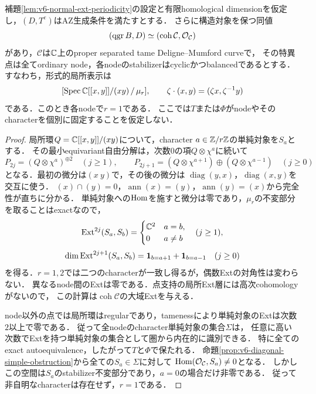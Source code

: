 \documentclass[11pt,a4paper]{ltjsarticle}
\begin{document}
\begin{corollary}[Balancedなstacky節点の排除]
\label{cor:v6-balanced-node-obstruction}
補題\ref{lem:v6-normal-ext-periodicity}の設定と有限homological dimensionを仮定し，$(D,T^e)$はAZ生成条件を満たすとする．
さらに構造対象を保つ同値
\[
 (\operatorname{qgr} B,D)\simeq(\operatorname{coh}\mathcal C,\mathcal O_{\mathcal C})
\]
があり，$\mathcal C$は$\mathbb C$上のproper separated tame Deligne--Mumford curveで，
その特異点は全てordinary node，各nodeのstabilizerはcyclicかつbalancedであるとする．
すなわち，形式的局所表示は
\[
 [\operatorname{Spec}\mathbb C[[x,y]]/(xy)\,/\,\mu_r],\qquad
 \zeta\cdot(x,y)=(\zeta x,\zeta^{-1}y)
\]
である．このとき各nodeで$r=1$である．
ここでは$T$または$\Phi$がnodeやそのcharacterを個別に固定することを仮定しない．
\end{corollary}
\begin{proof}
局所環$Q=\mathbb C[[x,y]]/(xy)$について，character $a\in\mathbb Z/r\mathbb Z$の単純対象を$S_a$とする．
その最小equivariant自由分解は，次数$0$の項$Q\otimes\chi^a$に続いて
\[
 P_{2j}=(Q\otimes\chi^a)^{\oplus2}\quad(j\geq1),\qquad
 P_{2j+1}=(Q\otimes\chi^{a+1})\oplus(Q\otimes\chi^{a-1})\quad(j\geq0)
\]
となる．最初の微分は$(x\ y)$で，その後の微分は
$\operatorname{diag}(y,x)$，$\operatorname{diag}(x,y)$を交互に使う．
$(x)\cap(y)=0$，$\operatorname{ann}(x)=(y)$，$\operatorname{ann}(y)=(x)$から完全性が直ちに分かる．
単純対象への$\operatorname{Hom}$を施すと微分は零であり，$\mu_r$の不変部分を取ることはexactなので，
\[
 \operatorname{Ext}^{2j}(S_a,S_b)=
 \begin{cases}\mathbb C^2&a=b,\\0&a\ne b\end{cases}\quad(j\geq1),
\]
\[
 \dim\operatorname{Ext}^{2j+1}(S_a,S_b)
 =\mathbf1_{b=a+1}+\mathbf1_{b=a-1}\quad(j\geq0)
\]
を得る．$r=1,2$では二つのcharacterが一致し得るが，偶数Extの対角性は変わらない．
異なるnode間のExtは零である．点支持の局所Ext層には高次cohomologyがないので，
この計算は$\operatorname{coh}\mathcal C$の大域Extを与える．

node以外の点では局所環はregularであり，tamenessにより単純対象のExtは次数$2$以上で零である．
従って全nodeのcharacter単純対象の集合$\Sigma$は，
任意に高い次数でExtを持つ単純対象の集合として圏から内在的に識別できる．
特に全てのexact autoequivalence，したがって$T$と$\Phi$で保たれる．
命題\ref{prop:v6-diagonal-simple-obstruction}から全ての$S_a\in\Sigma$に対して
$\operatorname{Hom}(\mathcal O_{\mathcal C},S_a)\ne0$となる．
しかしこの空間は$S_a$のstabilizer不変部分であり，$a=0$の場合だけ非零である．
従って非自明なcharacterは存在せず，$r=1$である．
\end{proof}
\end{document}
